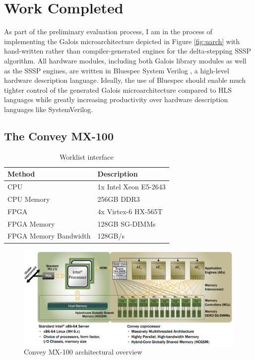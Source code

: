 %
\section{Work Completed}\label{sect:workCompleted}

As part of the preliminary evaluation process, I am in the process of implementing the Galois microarchitecture 
depicted in Figure \ref{fig:uarch} with hand-written rather than compiler-generated engines for the delta-stepping 
SSSP algorithm. All hardware modules, including both Galois library modules as well as the SSSP engines, are written 
in Bluespec System Verilog \cite{bluespec}, a high-level hardware description language.
Ideally, the use of Bluespec should enable much tighter control of 
the generated Galois microarchitecture compared to HLS languages while greatly increasing productivity over hardware 
description languages like SystemVerilog.

\subsection{The Convey MX-100}

\begin{table}
\centering
\begin{tabular}{ | l | l | }
  \hline
  \textbf{Method} & \textbf{Description} \\
  \hline
  CPU & 1x Intel Xeon E5-2643 \\
  \hline
  CPU Memory & 256GB DDR3 \\
  \hline
  FPGA & 4x Virtex-6 HX-565T \\
  \hline
  FPGA Memory & 128GB SG-DIMMs \\
  \hline
  FPGA Memory Bandwidth & 128GB/s \\
  \hline
\end{tabular}
\caption{Worklist interface}
\label{table:conveySpecs}
\end{table}

\begin{figure}
\centering
\includegraphics[width=15cm, keepaspectratio]{pics/convey.png}
\caption{Convey MX-100 architectural overview}
\label{fig:convey}
\end{figure}

